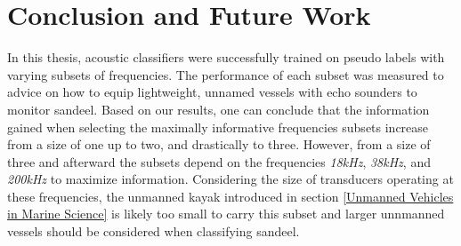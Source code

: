 \chapter{Conclusion and Future Work}
    In this thesis, acoustic classifiers were successfully trained on pseudo labels with varying subsets of frequencies. The performance of each subset was measured to advice on how to equip lightweight, unnamed vessels with echo sounders to monitor sandeel. Based on our results, one can conclude that the information gained when selecting the maximally informative frequencies subsets increase from a size of one up to two, and drastically to three. However, from a size of three and afterward the subsets depend on the frequencies \textit{18kHz}, \textit{38kHz}, and \textit{200kHz} to maximize information. Considering the size of transducers operating at these frequencies, the unmanned kayak introduced in section \ref{Unmanned Vehicles in Marine Science} is likely too small to carry this subset and larger unnmanned vessels should be considered when classifying sandeel.
    
    
    

